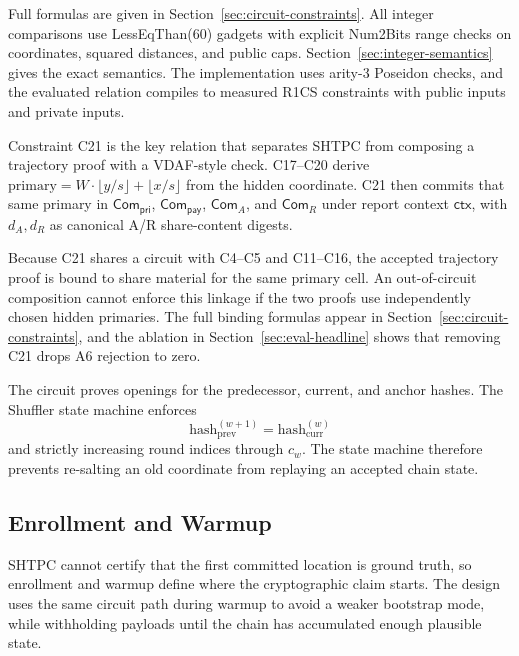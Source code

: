 \documentclass[journal]{IEEEtran}
\theoremstyle{definition}
\theoremstyle{plain}
\begin{document}
Full formulas are given in Section~\ref{sec:circuit-constraints}. All integer
comparisons use LessEqThan(60) gadgets with explicit Num2Bits range checks on
coordinates, squared distances, and public caps. Section~\ref{sec:integer-semantics}
gives the exact semantics. The implementation uses arity-3 Poseidon checks,
and the evaluated relation compiles to \VFourConstraints{} measured
R1CS constraints with \VFourPublicInputs{} public inputs and
\VFourPrivateInputs{} private inputs.

Constraint C21 is the key relation that separates \textsc{SHTPC} from composing
a trajectory proof with a VDAF-style check. C17--C20 derive
$\mathrm{primary}=W\cdot\lfloor y/s\rfloor+\lfloor x/s\rfloor$ from the hidden
coordinate. C21 then commits that same primary in
$\mathsf{Com}_{\mathsf{pri}}$, $\mathsf{Com}_{\mathsf{pay}}$,
$\mathsf{Com}_{A}$, and $\mathsf{Com}_{R}$ under report context
$\mathsf{ctx}$, with $d_A,d_R$ as canonical A/R share-content digests.

Because C21 shares a circuit with C4--C5 and C11--C16, the accepted trajectory
proof is bound to share material for the same primary cell. An out-of-circuit
composition cannot enforce this linkage if the two proofs use independently
chosen hidden primaries. The full binding formulas appear in
Section~\ref{sec:circuit-constraints}, and the ablation in
Section~\ref{sec:eval-headline} shows that removing C21 drops A6 rejection to
zero.

The circuit proves openings for the predecessor, current, and anchor hashes.
The Shuffler state machine enforces
\begin{equation}
  \mathrm{hash}_{\mathrm{prev}}^{(w+1)}
  =
  \mathrm{hash}_{\mathrm{curr}}^{(w)}
\end{equation}
and strictly increasing round indices through $c_w$. The state machine therefore
prevents re-salting an old coordinate from replaying an accepted chain state.

\subsection{Enrollment and Warmup}
\label{sec:enrollment}

\textsc{SHTPC} cannot certify that the first committed location is ground truth,
so enrollment and warmup define where the cryptographic claim starts. The design
uses the same circuit path during warmup to avoid a weaker bootstrap mode, while
withholding payloads until the chain has accumulated enough plausible state.
\end{document}
